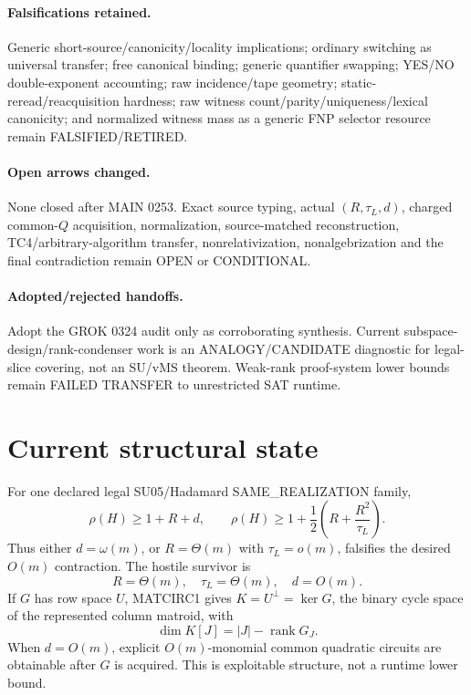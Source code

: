 \documentclass[11pt]{article}
\begin{document}
\paragraph{Falsifications retained.} Generic short-source/canonicity/locality implications; ordinary switching as universal transfer; free canonical binding; generic quantifier swapping; YES/NO double-exponent accounting; raw incidence/tape geometry; static-reread/reacquisition hardness; raw witness count/parity/uniqueness/lexical canonicity; and normalized witness mass as a generic FNP selector resource remain FALSIFIED/RETIRED.

\paragraph{Open arrows changed.} None closed after MAIN 0253. Exact source typing, actual \((R,\tau_L,d)\), charged common-\(Q\) acquisition, normalization, source-matched reconstruction, TC4/arbitrary-algorithm transfer, nonrelativization, nonalgebrization and the final contradiction remain OPEN or CONDITIONAL.

\paragraph{Adopted/rejected handoffs.} Adopt the GROK 0324 audit only as corroborating synthesis. Current subspace-design/rank-condenser work is an ANALOGY/CANDIDATE diagnostic for legal-slice covering, not an SU/vMS theorem. Weak-rank proof-system lower bounds remain FAILED TRANSFER to unrestricted SAT runtime.

\section*{Current structural state}
For one declared legal SU05/Hadamard SAME\_REALIZATION family,
\[
\boxed{\rho(H)\ge1+R+d},\qquad
\boxed{\rho(H)\ge1+\frac12\left(R+\frac{R^2}{\tau_L}\right)}.
\]
Thus either \(d=\omega(m)\), or \(R=\Theta(m)\) with \(\tau_L=o(m)\), falsifies the desired \(O(m)\) contraction. The hostile survivor is
\[
\boxed{R=\Theta(m),\quad \tau_L=\Theta(m),\quad d=O(m).}
\]
If \(G\) has row space \(U\), MATCIRC1 gives \(K=U^\perp=\ker G\), the binary cycle space of the represented column matroid, with
\[
\dim K[J]=|J|-\operatorname{rank}G_J.
\]
When \(d=O(m)\), explicit \(O(m)\)-monomial common quadratic circuits are obtainable after \(G\) is acquired. This is exploitable structure, not a runtime lower bound.
\end{document}
